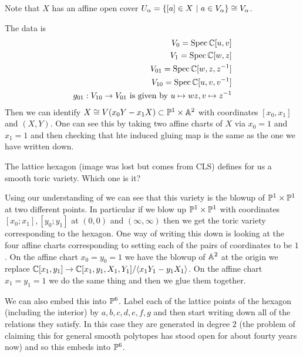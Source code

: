 \documentclass[12pt]{article}
\begin{document}
\begin{remark}
	Note that $X$ has an affine open cover $U_\alpha = \set{[a]\in X \st a\in V_\alpha} \cong V_\alpha$.
\end{remark}
\begin{example}
	 The data is \begin{align*}
		V_0 = \Spec \C[u,v]            \\
		V_1 = \Spec \C[w,z]            \\
		V_{01} = \Spec \C[w,z,\inv{z}] \\
		V_{10} = \Spec \C[u,v,\inv{v}] \\
		g_{01}:V_{10} \to V_{01} \text{ is given by } u\mapsto wz, v\mapsto \inv{z}
	\end{align*}
	Then we can identify $X \cong V(x_0Y - x_1X)\subset \P^1\times \A^2$ with coordinates $[x_0,x_1]$ and $(X,Y)$. One can see this
	by taking two affine charts of $X$ via $x_0 = 1$ and $x_1 = 1$ and then checking that hte induced gluing map is the same as the one
	we have written down.
\end{example}

\begin{example}
	The lattice hexagon (image was lost but comes from CLS) defines for us a smooth toric variety. Which one is it?

	\hfill

	Using our understanding of  we can see that this variety is the
	blowup of $\P^1 \times \P^1$ at two different points.  In particular if we blow up $\P^1\times \P^1$ with coordinates $[x_0;x_1],[y_0;y_1]$ at $(0,0)$ and $(\infty,\infty)$
	then we get the toric variety corresponding to the hexagon. One way of writing this down is looking at the four affine charts corresponding to
	setting each of the pairs of coordinates to be $1$. On the affine chart $x_0 = y_0 = 1$ we have the blowup of $\A^2$ at the origin
	we replace $\C[x_1,y_1] \to \C[x_1,y_1,X_1,Y_1]/\ideal{x_1Y_1 - y_1X_1}$. On the affine chart $x_1 = y_1 = 1$ we do the same thing
	and then we glue them together.

	\hfill


	\hfill


	We can also embed this into $\P^6$. Label each of the lattice points of the hexagon (including the interior)
	by $a,b,c,d,e,f,g$ and then start writing down all of the relations they satisfy. In this case they are generated in
	degree $2$ (the problem of claiming this for general smooth polytopes has stood open for about fourty years now) and so
	this embeds into $\P^6$.
\end{example}
\end{document}
